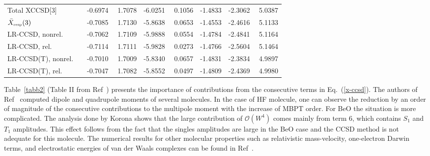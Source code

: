 \documentclass[preprint,12pt]{elsarticle}
\newcommand{\fr}[1]{Eq.~(\ref{#1})}
\newcommand{\Frt}[1]{Table~\ref{#1}}
\newcommand{\mt}[1]{\mbox{\tiny{#1}}}
\begin{document}
\begin{table}[!ht]
\begin{adjustbox}{max width=\textwidth}
\begin{threeparttable}
\begin{tabular}{l c lllllll}
Total XCCSD[3] &  & -0.6974 & $\,\,$1.7078 & -6.0251 & $\,\,$0.1056 & -1.4833 & -2.3062 & $\,\,$5.0387\\
$\bar{X}_{\mt{resp}}(3)$ &  & -0.7085 & $\,\,$1.7130 & -5.8638 & $\,\,$0.0653 & -1.4553 & -2.4616 & $\,\,$5.1133\\
LR-CCSD, nonrel. &  & -0.7062 & $\,\,$1.7109 & -5.9888 & $\,\,$0.0554 & -1.4784 & -2.4841 & $\,\,$5.1164\\
LR-CCSD, rel. &  & -0.7114 & $\,\,$1.7111 & -5.9828 & $\,\,$0.0273 & -1.4766 & -2.5604 & $\,\,$5.1464\\
LR-CCSD(T), nonrel. &  & -0.7010 & $\,\,$1.7009 & -5.8340 & $\,\,$0.0657 & -1.4831 & -2.3834 & $\,\,$4.9897\\
LR-CCSD(T), rel. &  & -0.7047 & $\,\,$1.7082 & -5.8552 & $\,\,$0.0497 & -1.4809 & -2.4369 & $\,\,$4.9980
\end{tabular}
   \end{threeparttable}
   \end{adjustbox}
 \end{table}

\Frt{tabb2} (Table II from Ref~\citep{korona2006one}) presents the importance of contributions from the consecutive terms in \fr{x-ccsd}. 
The authors of Ref~\citep{korona2006one} computed dipole and quadrupole moments of several molecules.
In the case of HF molecule, one can observe the reduction by an order of
magnitude of the consecutive contributions to the multipole moment with the increase of MBPT order.
For BeO the situation is more complicated. The analysis done
by Korona\cite{korona2006one} shows that the large contribution of $\mathscr{O}(W^4)$ comes mainly from term 6, which contains $S_1$ and $T_1$ amplitudes. This effect follows from the fact that the singles amplitudes are large in the BeO case and the CCSD method is not adequate for this molecule.
The numerical results for other molecular properties such as 
relativistic mass-velocity, one-electron Darwin terms, and electrostatic energies of van der Waals complexes can be found
in Ref~\citep{korona2006one}.
\end{document}

